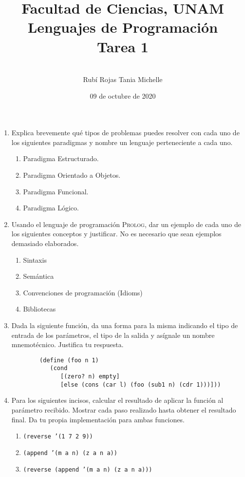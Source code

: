 \documentclass[letterpaper,11pt]{article}
\title{Facultad de Ciencias, UNAM \\ 
       Lenguajes de Programación \\ 
       Tarea 1}
\author{ \\ 
        Rubí Rojas Tania Michelle }
\date{09 de octubre de 2020}
\begin{document}
\maketitle

\begin{enumerate}
    \item Explica brevemente qué tipos de problemas puedes resolver con cada uno
    de los siguientes paradigmas y nombre un lenguaje perteneciente a cada uno.
    \begin{enumerate}
        \item Paradigma Estructurado.
        \item Paradigma Orientado a Objetos.
        \item Paradigma Funcional.
        \item Paradigma Lógico.
    \end{enumerate}

    \item Usando el lenguaje de programación \textsc{Prolog}, dar un ejemplo de 
    cada uno de los siguientes conceptos y justificar. No es necesario que sean 
    ejemplos demasiado elaborados. 
    \begin{enumerate}
        \item Sintaxis
        \item Semántica
        \item Convenciones de programación (Idioms)
        \item Bibliotecas
    \end{enumerate}

    \item Dada la siguiente función, da una forma para la misma indicando el 
    tipo de entrada de los parámetros, el tipo de la salida y asígnale un nombre 
    mnemotécnico. Justifica tu respuesta. 
    \begin{verbatim}
        (define (foo n 1)
           (cond 
              [(zero? n) empty]
              [else (cons (car l) (foo (sub1 n) (cdr 1)))]))
    \end{verbatim}

    \item Para los siguientes incisos, calcular el resultado de aplicar la 
    función al parámetro recibido. Mostrar cada paso realizado hasta obtener el 
    resultado final. Da tu propia implementación para ambas funciones.
    \begin{enumerate}
        \item \texttt{(reverse '(1 7 2 9))}
        \item \texttt{(append '(m a n) (z a n a))}
        \item \texttt{(reverse (append '(m a n) (z a n a)))}
    \end{enumerate} 


\end{enumerate}
\end{document}
